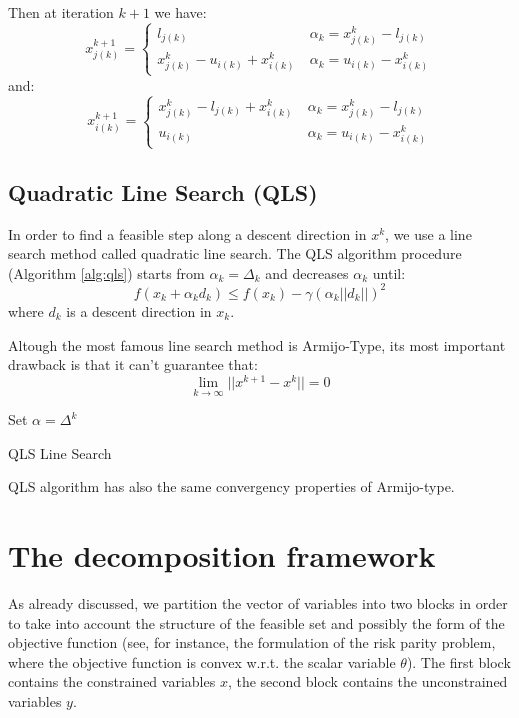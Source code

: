 Then at iteration $k+1$ we have:
\begin{equation*}
x^{k+1}_{j(k)}=\begin{cases}
 l_{j(k)} \ &\alpha_k=x^k_{j(k)}-l_{j(k)}\\
 x^k_{j(k)}-u_{i(k)} +x^k_{i(k)} \ &\alpha_k=u_{i(k)} -x^k_{i(k)}
 \end{cases}
\end{equation*}
and:
\begin{equation*}
x^{k+1}_{i(k)}=\begin{cases}
 x^k_{j(k)}-l_{j(k)}+x^k_{i(k)} \ &\alpha_k=x^k_{j(k)}-l_{j(k)}\\
 u_{i(k)} \ &\alpha_k=u_{i(k)}-x^k_{i(k)}
 \end{cases}
\end{equation*}
\subsection{Quadratic Line Search (QLS)}
In order to find a feasible step along a descent direction in $x^k$, we use a line search method called quadratic line search. The QLS algorithm procedure (Algorithm \ref{alg:qls}) starts from $\alpha_k = \Delta_k$ and decreases $\alpha_k$ until:
\begin{equation}
f(x_k+\alpha_kd_k) \le  f(x_k)- \gamma (\alpha_k||d_k||)^2
\end{equation}
 where $d_k$ is a descent direction in $x_k$.

Altough the most famous line search method is Armijo-Type, its most important drawback is that it can't guarantee that:
\begin{equation}
 \displaystyle \lim_{k\rightarrow \infty} ||x^{k+1}-x^{k}|| =0
\end{equation}

 \begin{algorithm}[ht]
 Set $\alpha = \Delta^{k}$\\
 \caption{QLS Line Search}\label{alg:qls}
\end{algorithm}

QLS algorithm has also the same convergency properties \cite{sciandrone-galligari-dilorenzo} of Armijo-type.
\section{The decomposition framework}
As already discussed, we partition the vector of variables into two blocks in order to take into account
the structure of the feasible set and possibly the form of the objective function (see, for instance,
the formulation of the risk parity problem, where the objective function is convex w.r.t. the scalar variable $\theta$).
The first block contains the constrained variables $x$, the second block contains
the unconstrained variables $y$. 

